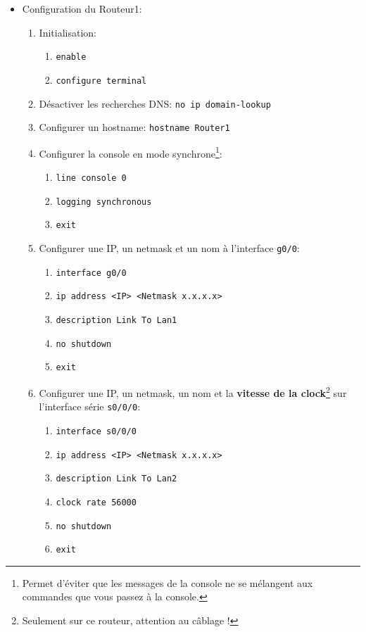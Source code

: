 \documentclass[a4paper]{article}
\begin{document}
\begin{itemize}
\item Configuration du Routeur1:
\begin{enumerate}

    \item Initialisation:
    \begin{enumerate}
        \item \texttt{enable}
        \item \texttt{configure terminal}
    \end{enumerate}

    \item Désactiver les recherches DNS: \texttt{no ip domain-lookup}

    \item Configurer un hostname: \texttt{hostname Router1}

    \item Configurer la console en mode synchrone\footnote{Permet d’éviter que les messages de la console ne se mélangent aux commandes que vous passez à la console.}:
    \begin{enumerate}
        \item \texttt{line console 0}
        \item \texttt{logging synchronous}
        \item \texttt{exit}
    \end{enumerate}

    \item Configurer une IP, un netmask et un nom à l'interface \texttt{g0/0}:
    \begin{enumerate}
        \item \texttt{interface g0/0}
        \item \texttt{ip address <IP> <Netmask x.x.x.x>}
        \item \texttt{description Link To Lan1}
        \item \texttt{no shutdown}
        \item \texttt{exit}
    \end{enumerate}

    \item Configurer une IP, un netmask, un nom et la \textbf{vitesse de la clock}\footnote{Seulement sur ce routeur, attention au câblage !} sur l'interface série \texttt{s0/0/0}:
    \begin{enumerate}
        \item \texttt{interface s0/0/0}
        \item \texttt{ip address <IP> <Netmask x.x.x.x>}
        \item \texttt{description Link To Lan2}
        \item \texttt{clock rate 56000}
        \item \texttt{no shutdown}
        \item \texttt{exit}
    \end{enumerate}


\end{enumerate}
\end{itemize}
\end{document}
